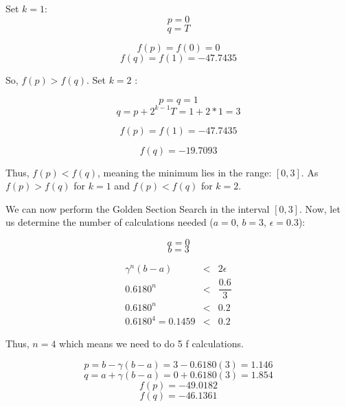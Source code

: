 \documentclass[a4paper]{article}
\begin{document}
Set $k = 1$:
\begin{equation}
p = 0
\end{equation}
\begin{equation}
q = T
\end{equation}

\begin{equation}
f(p) = f(0) =  0
\end{equation}
\begin{equation}
f(q) = f(1) = -47.7435
\end{equation}

So, $f(p) > f(q)$. Set $k = 2$ :

\begin{equation}
p = q = 1
\end{equation}
\begin{equation}
q = p + 2^{k - 1}T = 1 + 2*1 = 3
\end{equation}

\begin{equation}
f(p) = f(1) = -47.7435
\end{equation}

\begin{equation}
f(q) = -19.7093
\end{equation}


Thus, $ f(p) < f(q)$, meaning the minimum lies in the range: $[0, 3]$.  As $f(p) > f(q)$ for $k = 1$  and $f(p) < f(q)$ for $k = 2$.

We can now perform the Golden Section Search in the interval $[0, 3]$. Now, let us determine the number of calculations needed ($a = 0$, $b = 3$, $\epsilon = 0.3$):

\begin{equation}
a = 0
\end{equation}
\begin{equation}
b = 3
\end{equation}

\begin{eqnarray}
\gamma^n (b - a) &<& 2\epsilon\\ 
0.6180^n &<& \dfrac{0.6}{3}\\
0.6180^n &<& 0.2 \\
0.6180^4 = 0.1459 &<& 0.2
\end{eqnarray}

Thus, $ n = 4 $ which means we need to do 5 f calculations.

\begin{equation}
p = b - \gamma(b - a) = 3 - 0.6180(3) = 1.146
\end{equation}
\begin{equation}
q = a + \gamma(b - a) = 0 + 0.6180(3) = 1.854
\end{equation}
\begin{equation}
f(p) = -49.0182
\end{equation}
\begin{equation}
f(q) = -46.1361
\end{equation}
\end{document}

